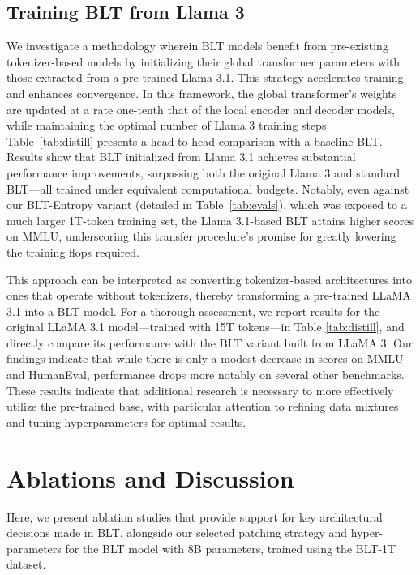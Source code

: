 \subsection{Training {\textsc BLT} from Llama 3}
\label{sec:distillation}
We investigate a methodology wherein {\textsc BLT} models benefit from pre-existing tokenizer-based models by initializing their global transformer parameters with those extracted from a pre-trained Llama 3.1. This strategy accelerates training and enhances convergence. In this framework, the global transformer’s weights are updated at a rate one-tenth that of the local encoder and decoder models, while maintaining the optimal number of Llama 3 training steps. Table~\ref{tab:distill} presents a head-to-head comparison with a baseline {\textsc BLT}. Results show that {\textsc BLT} initialized from Llama 3.1 achieves substantial performance improvements, surpassing both the original Llama 3 and standard {\textsc BLT}—all trained under equivalent computational budgets. Notably, even against our {\textsc BLT}-Entropy variant (detailed in Table~\ref{tab:evals}), which was exposed to a much larger 1T-token training set, the Llama 3.1-based {\textsc BLT} attains higher scores on MMLU, underscoring this transfer procedure's promise for greatly lowering the training flops required.

This approach can be interpreted as converting tokenizer-based architectures into ones that operate without tokenizers, thereby transforming a pre-trained LLaMA 3.1 into a {\textsc BLT} model. For a thorough assessment, we report results for the original LLaMA 3.1 model—trained with 15T tokens—in Table \ref{tab:distill}, and directly compare its performance with the {\textsc BLT} variant built from LLaMA 3. Our findings indicate that while there is only a modest decrease in scores on MMLU and HumanEval, performance drops more notably on several other benchmarks. These results indicate that additional research is necessary to more effectively utilize the pre-trained base, with particular attention to refining data mixtures and tuning hyperparameters for optimal results.

\section{Ablations and Discussion}
\label{section:ablations}
Here, we present ablation studies that provide support for key architectural decisions made in {\textsc BLT}, alongside our selected patching strategy and hyper-parameters for the {\textsc BLT} model with 8B parameters, trained using the {\textsc BLT}-1T dataset.


